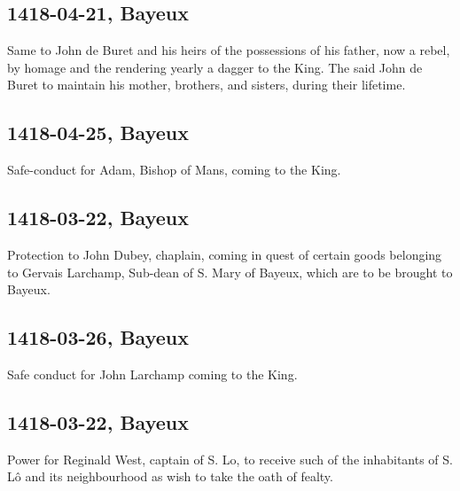 \documentclass[a4paper,12pt,twoside]{book}
\begin{document}
                
                \subsection{1418-04-21, Bayeux}
                
                
                     Same to John de Buret and his heirs of the possessions of his father, now a rebel, by homage and the rendering yearly a dagger to the King. The said John de Buret to maintain his mother, brothers, and sisters, during their lifetime.
                  
                
                \subsection{1418-04-25, Bayeux}
                
                
                     Safe-conduct for Adam, Bishop of Mans, coming to the King.
                  
                
                \subsection{1418-03-22, Bayeux}
                
                
                     Protection to John Dubey, chaplain, coming in quest of certain goods belonging to Gervais Larchamp, Sub-dean of S. Mary of Bayeux, which are to be brought to Bayeux.
                  
                
                \subsection{1418-03-26, Bayeux}
                
                
                     Safe conduct for John Larchamp coming to the King.
                  
                
                \subsection{1418-03-22, Bayeux}
                
                
                     Power for Reginald West, captain of S. Lo, to receive such of the inhabitants of S. Lô and its neighbourhood as wish to take the oath of fealty.
                  
\end{document}
